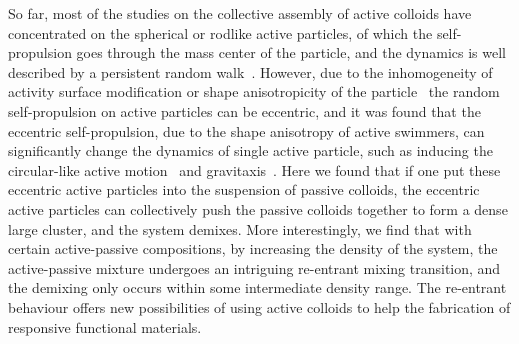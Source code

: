 \documentclass[prl, twocolumn, showpacs, preprintnumbers,amsmath,amssymb]{revtex4-1}
\begin{document}
So far, most of the studies on the collective assembly of active colloids have concentrated on the spherical or rodlike active particles, of which the self-propulsion goes through the mass center of the particle, and the dynamics is well described by a persistent random walk~\cite{howse2007}. However, due to the inhomogeneity of activity surface modification or shape anisotropicity of the particle~\cite{debnath2016diffusion,soto2014self,niu2017self,ni2017hybrid} the random self-propulsion on active particles can be eccentric, and it was found that the eccentric self-propulsion, due to the shape anisotropy of active swimmers, can significantly change the dynamics of single active particle, such as inducing the circular-like  active motion~\cite{circuleswim} and gravitaxis~\cite{hagen2014gravitaxis,wolff2013sedimentation}. Here we found that if one put these eccentric active particles into the suspension of passive colloids, the eccentric active particles can collectively push the passive colloids together to form a dense large cluster, and the system demixes.
More interestingly, we find that with certain active-passive compositions, by increasing the density of the system, the active-passive mixture undergoes an intriguing re-entrant mixing transition, and the demixing only occurs within some intermediate density range. The re-entrant behaviour offers new possibilities of using active colloids to help the fabrication of responsive functional materials.

\begin{figure*}[t!]
\centering
\caption{\label{fig1} {\bf Illustration of the binary passive-EABP mixture.}
(a) The schematic illustration of EABPs (blue) and passive particles (red) in the system. (b,c) The radial distribution $g(r)$ of EABPs and passive particles (mass center) with respect to the instant center of circular trajectory of the reference EABP in the infinitely dilute limit for $\theta= 4.5 ^{\circ}$ (b) and $30^{\circ}$ (c) with $ f\sigma /k_BT =10$ and 200.}
\end{figure*}
\end{document}
